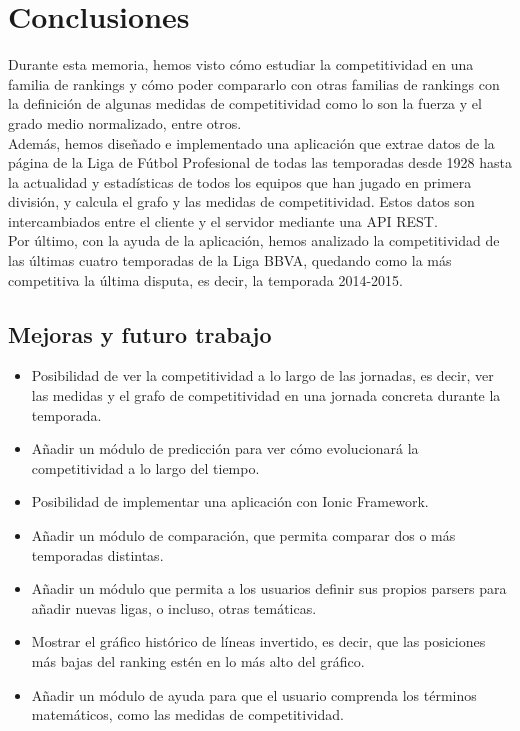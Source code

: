 \chapter{Conclusiones}

Durante esta memoria, hemos visto cómo estudiar la competitividad en una familia de rankings y cómo poder compararlo con otras familias de rankings con la definición de algunas medidas de competitividad como lo son la fuerza y el grado medio normalizado, entre otros.\\

Además, hemos diseñado e implementado una aplicación que extrae datos de la página de la Liga de Fútbol Profesional de todas las temporadas desde 1928 hasta la actualidad y estadísticas de todos los equipos que han jugado en primera división, y calcula el grafo y las medidas de competitividad. Estos datos son intercambiados entre el cliente y el servidor mediante una API REST.\\

Por último, con la ayuda de la aplicación, hemos analizado la competitividad de las últimas cuatro temporadas de la Liga BBVA, quedando como la más competitiva la última disputa, es decir, la temporada 2014-2015.

\section{Mejoras y futuro trabajo}

\begin{itemize}
\item Posibilidad de ver la competitividad a lo largo de las jornadas, es decir, ver las medidas y el grafo de competitividad en una jornada concreta durante la temporada.

\item Añadir un módulo de predicción para ver cómo evolucionará la competitividad a lo largo del tiempo.

\item Posibilidad de implementar una aplicación con Ionic Framework.

\item Añadir un módulo de comparación, que permita comparar dos o más temporadas distintas.

\item Añadir un módulo que permita a los usuarios definir sus propios parsers para añadir nuevas ligas, o incluso, otras temáticas.

\item Mostrar el gráfico histórico de líneas invertido, es decir, que las posiciones más bajas del ranking estén en lo más alto del gráfico.

\item Añadir un módulo de ayuda para que el usuario comprenda los términos matemáticos, como las medidas de competitividad.
\end{itemize}
